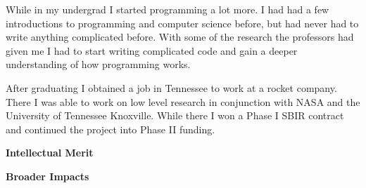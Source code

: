 \documentclass[12pt]{article}
\begin{document}
While in my undergrad I started programming a lot more. I had had a few
introductions to programming and computer science before, but had never had to
write anything complicated before. With some of the research the professors had
given me I had to start writing complicated code and gain a deeper understanding
of how programming works. 

After graduating I obtained a job in Tennessee to work at a rocket company.
There I was able to work on low level research in conjunction with NASA and the
University of Tennessee Knoxville. While there I won a Phase I SBIR contract and
continued the project into Phase II funding. 

\noindent\textbf{Intellectual Merit}
\noindent

\noindent\textbf{Broader Impacts}
\noindent
\end{document}
